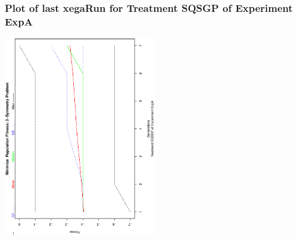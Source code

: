 \begin{frame}
 \frametitle{ Plot of last xegaRun for Treatment SQSGP of Experiment ExpA }
 \begin{center}
\includegraphics[width=0.5\textwidth, angle=-90]
{ExpAPlotPopStatsFigure004.eps}
 \end{center}
 \label{report/ExpAPlotPopStatsFigure004.eps}  
 \end{frame}

